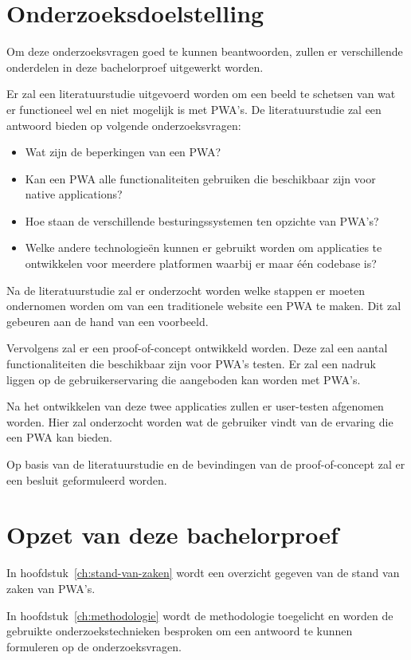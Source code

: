 \section{Onderzoeksdoelstelling}
	
	Om deze onderzoeksvragen goed te kunnen beantwoorden, zullen er verschillende onderdelen in deze bachelorproef uitgewerkt worden.
	
	Er zal een literatuurstudie uitgevoerd worden om een beeld te schetsen van wat er functioneel wel en niet mogelijk is met PWA's. 
	De literatuurstudie zal een antwoord bieden op volgende onderzoeksvragen:
	\begin{itemize}
		  \item Wat zijn de beperkingen van een PWA?
		  \item Kan een PWA alle functionaliteiten gebruiken die beschikbaar zijn voor native applications?
		  \item Hoe staan de verschillende besturingssystemen ten opzichte van PWA's?
		  \item Welke andere technologieën kunnen er gebruikt worden om applicaties te ontwikkelen voor meerdere platformen waarbij er maar één codebase is?
	  \end{itemize}	
	  
	Na de literatuurstudie zal er onderzocht worden welke stappen er moeten ondernomen worden om van een traditionele website een PWA te maken. Dit zal gebeuren aan de hand van een voorbeeld.
	
	Vervolgens zal er een proof-of-concept ontwikkeld worden. Deze zal een aantal functionaliteiten die beschikbaar zijn voor PWA's testen. Er zal een nadruk liggen op de gebruikerservaring die aangeboden kan worden met PWA's. 
	
	Na het ontwikkelen van deze twee applicaties zullen er user-testen afgenomen worden. Hier zal onderzocht worden wat de gebruiker vindt van de ervaring die een PWA kan bieden.
	
	Op basis van de literatuurstudie en de bevindingen van de proof-of-concept zal er een besluit geformuleerd worden.
	
\section{Opzet van deze bachelorproef}

	In hoofdstuk~\ref{ch:stand-van-zaken} wordt een overzicht gegeven van de stand van zaken van PWA's.
	
	In hoofdstuk~\ref{ch:methodologie} wordt de methodologie toegelicht en worden de gebruikte onderzoekstechnieken besproken om een antwoord te kunnen formuleren op de onderzoeksvragen.
	
